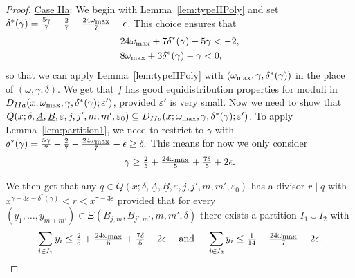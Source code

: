 \documentclass{amsart}
\numberwithin{equation}{section}
\begin{document}
\begin{proof}
\medskip
\underline{Case IIa}:  We begin with Lemma~\ref{lem:typeIIPoly} and set 
$\delta^*(\gamma) =  \frac{5\gamma}{7}-\frac{2}{7}  -\frac{24\omega_{\begin{scriptsize}
\mbox{max}\end{scriptsize}}}{7} -\epsilon$. This choice ensures that 
 \begin{align*}
&24\omega_{\begin{scriptsize}
\mbox{max}\end{scriptsize}} + 7\delta^*(\gamma) -5\gamma <-2, \\
&8\omega_{\begin{scriptsize}
\mbox{max}\end{scriptsize}} + 3\delta^*(\gamma) -\gamma <0,
\end{align*}
so that we can apply Lemma~\ref{lem:typeIIPoly} with $(\omega_{\begin{scriptsize}
\mbox{max}
\end{scriptsize}}, \gamma, \delta^*(\gamma))$ in the place of $(\omega, \gamma, \delta)$. We get that $f$ has good equidistribution properties for moduli in $D_{IIa}(x;\omega_{\begin{scriptsize}
\mbox{max}
\end{scriptsize}},\gamma,\delta^*(\gamma);\varepsilon')$, provided $\varepsilon'$ is very small. Now we   need to show that   $ Q(x;\delta,\underline{A},\underline{B},\varepsilon,j,j',m,m',\varepsilon_0) \subseteq D_{IIa}(x;\omega_{\begin{scriptsize}
\mbox{max}
\end{scriptsize}},\gamma,\delta^*(\gamma);\varepsilon')$. To apply Lemma~\ref{lem:partition1}, we need to restrict to $\gamma$ with 
$
\delta^*(\gamma) =  \frac{5\gamma}{7}-\frac{2}{7}  -\frac{24\omega_{\begin{scriptsize}
\mbox{max}\end{scriptsize}}}{7} -\epsilon \geq \delta.
$
This means for now we only consider $$\gamma \geq  \tfrac{2}{5}+\tfrac{24\omega_{\begin{scriptsize}
\mbox{max}\end{scriptsize}}}{5} +\tfrac{7\delta}{5}  +2\epsilon.$$

\bigskip
We then get that any $q \in Q(x;\delta,\underline{A},\underline{B},\varepsilon,j,j',m,m',\varepsilon_0)$ has a divisor $r \mid q$ with  $   x^{\gamma -3\varepsilon-\delta^*(\gamma)} < r < x^{\gamma - 3\varepsilon}$ provided that  for  every  $(y_1, \dots, y_{m+m'}) \in \Xi(B_{j,m},B_{j',m'},m,m',\delta)$  there exists a partition $I_1 \cup I_2$ with  
\begin{align}
\sum_{i \in I_1} y_i \leq \tfrac{2}{5}+\tfrac{24\omega_{\begin{scriptsize}
\mbox{max}\end{scriptsize}}}{5} +\tfrac{7\delta}{5}   -2 \epsilon \quad \mbox{ and } \quad  \sum_{i \in I_2} y_i \leq \tfrac{1}{14}     -\tfrac{24\omega_{\begin{scriptsize}
\mbox{max}\end{scriptsize}}}{7} -2\epsilon.
\end{align}
 

\end{proof}
\end{document}
